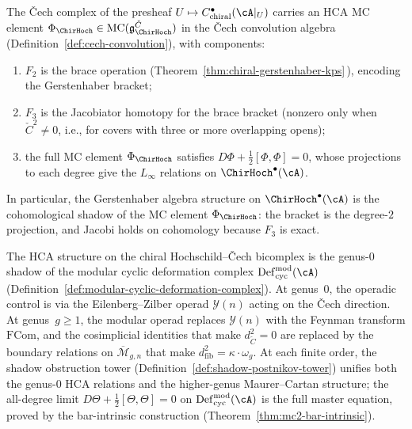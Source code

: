 \begin{conjecture}
\label{conj:hca-hochschild}
The \v{C}ech complex of the presheaf
$U \mapsto C^\bullet_{\mathrm{chiral}}(\cA|_U)$
carries an HCA MC element
$\Phi_{\ChirHoch} \in
\operatorname{MC}(\mathfrak{g}^{\check{C}}_{\ChirHoch})$
in the \v{C}ech convolution algebra
\textup{(}Definition~\textup{\ref{def:cech-convolution})},
with components:
\begin{enumerate}[label=\textup{(\roman*)}]
\item $F_2$ is the brace operation
 (Theorem~\ref{thm:chiral-gerstenhaber-kps}$\,$), encoding the
 Gerstenhaber bracket;
\item $F_3$ is the Jacobiator homotopy for the brace bracket
 (nonzero only when $\check{C}^2 \neq 0$, i.e., for covers
 with three or more overlapping opens);
\item the full MC element $\Phi_{\ChirHoch}$
 satisfies $D\Phi + \tfrac{1}{2}[\Phi,\Phi] = 0$, whose
 projections to each degree give the $L_\infty$ relations
 on $\ChirHoch^\bullet(\cA)$.
\end{enumerate}
In particular, the Gerstenhaber algebra structure on
$\ChirHoch^\bullet(\cA)$ is the cohomological shadow of the
MC element $\Phi_{\ChirHoch}$: the bracket is the degree-$2$
projection, and Jacobi holds on cohomology because $F_3$ is
exact.
\end{conjecture}

\begin{remark}
\label{rem:hca-vs-modular-deformation}
The HCA structure on the chiral Hochschild--\v{C}ech bicomplex is the
genus-$0$ shadow of the modular cyclic deformation complex
$\mathrm{Def}_{\mathrm{cyc}}^{\mathrm{mod}}(\cA)$
(Definition~\ref{def:modular-cyclic-deformation-complex}).
At genus~$0$, the operadic control is via the Eilenberg--Zilber
operad $\mathcal{Y}(n)$ acting on the \v{C}ech direction.
At genus~$g \geq 1$, the modular operad replaces
$\mathcal{Y}(n)$ with the Feynman transform $\mathrm{FCom}$,
and the cosimplicial identities that make $d_{\check{C}}^2 = 0$
are replaced by the boundary relations on
$\overline{\mathcal{M}}_{g,n}$ that make
$d_{\mathrm{fib}}^2 = \kappa \cdot \omega_g$.
At each finite order, the shadow obstruction tower
(Definition~\ref{def:shadow-postnikov-tower}) unifies
both the genus-$0$ HCA relations and the higher-genus
Maurer--Cartan structure; the all-degree limit
$D\Theta + \tfrac{1}{2}[\Theta,\Theta] = 0$
on $\mathrm{Def}_{\mathrm{cyc}}^{\mathrm{mod}}(\cA)$
is the full master equation, proved by the bar-intrinsic
construction (Theorem~\ref{thm:mc2-bar-intrinsic}).
\end{remark}

